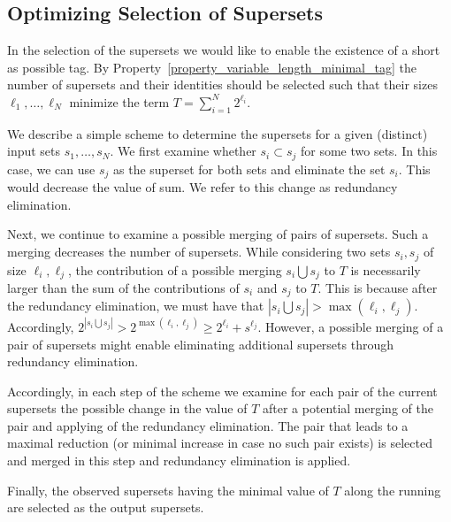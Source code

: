 \subsection{Optimizing Selection of Supersets}
In the selection of the supersets we would like to enable the existence of a short as possible tag. By Property~\ref{property_variable_length_minimal_tag} the number of supersets and their identities should be selected such that their sizes $\ell_1, \ldots, \ell_N$ minimize the term $T = \sum_{i = 1}^{N}{2^{\ell_i}}$. 

We describe a simple scheme to determine the supersets for a given (distinct) input sets $s_1, \ldots, s_N$. We first examine whether $s_i \subset s_j$ for some two sets. In this case, we can use $s_j$ as the superset for both sets and eliminate the set $s_i$. This would decrease the value of sum. We refer to this change as redundancy elimination.

Next,  we continue to examine a possible merging of pairs of supersets. Such a merging decreases the number of supersets. While considering two sets $s_i, s_j$ of 
size $\ell_i, \ell_j$, the contribution of  a possible merging $s_i \bigcup s_j$ to $T$ is necessarily larger than  the sum of the contributions of $s_i$ and $s_j$ to $T$.
This is because after the redundancy elimination, we must have that $|s_i \bigcup s_j| > \max(\ell_i, \ell_j)$. Accordingly,  $2^{|s_i \bigcup s_j|} > 2^{\max(\ell_i, \ell_j)} \ge 
2^{\ell_i} + s^{\ell_j}$. However, a possible merging of a pair of supersets might enable eliminating additional supersets through redundancy elimination.

Accordingly, in each step of the scheme we examine for each pair of the current supersets the possible change in the value of $T$ after a potential merging of the pair and applying of the redundancy elimination. The pair that leads to a maximal reduction (or minimal increase in case no such pair exists) is selected and merged in this step and  redundancy elimination is applied. 

Finally,  the observed supersets having the minimal value of $T$ along the running are selected as the output supersets.
 